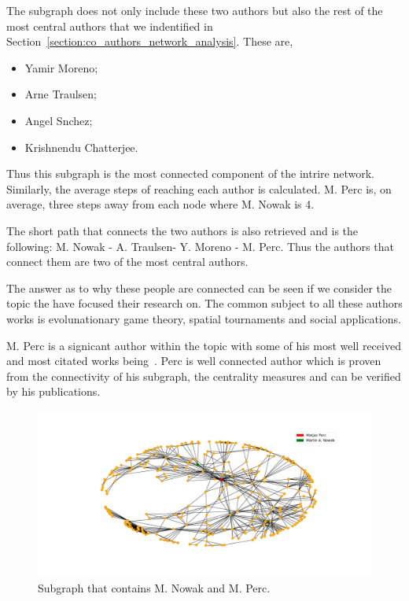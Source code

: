 \documentclass{article}
\begin{document}
The subgraph does not only include these two authors but also the rest of 
the most central authors that we indentified in Section~\ref{section:co_authors_network_analysis}.
These are,

\begin{itemize}
    \item Yamir Moreno;
    \item Arne Traulsen;
    \item Angel Snchez;
    \item Krishnendu Chatterjee.
\end{itemize}

Thus this subgraph is the most connected component of the intrire network. 
Similarly, the average steps of reaching each author is calculated. M. Perc is,
on average, three steps away from each node where M. Nowak is 4.

The short path that connects the two authors is also retrieved and is the following:
M. Nowak - A. Traulsen- Y. Moreno - M. Perc. Thus the authors that connect them
are two of the most central authors. 

The answer as to why these people are connected can be seen if we consider the
topic the have focused their research on. The common subject to all these authors
works is evolunationary game theory, spatial tournaments and social applications.

M. Perc is a signicant author within the topic with some of his most well received
and most citated works being~\cite{Perc2013b, Perc2008, Perc2010, Perc2013}.
Perc is well connected author which is proven from the connectivity of his
subgraph, the centrality measures and can be verified by his publications.

\begin{figure}[!hbtp]
    \centering
    \includegraphics[width=\textwidth]{./assets/images/Perc.pdf}
    \caption{Subgraph that contains M. Nowak and M. Perc.}
    \label{fig:perc_clique}
\end{figure}
\end{document}
